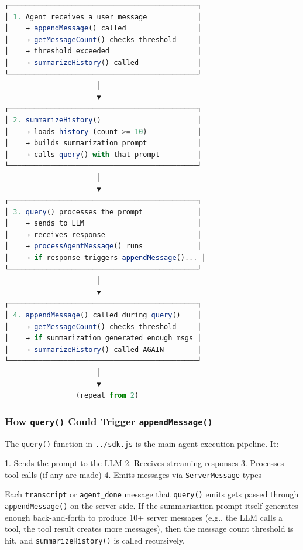 \begin{lstlisting}[language=TypeScript]
┌─────────────────────────────────────────────┐
│ 1. Agent receives a user message            │
│    → appendMessage() called                 │
│    → getMessageCount() checks threshold     │
│    → threshold exceeded                     │
│    → summarizeHistory() called              │
└─────────────────────────────────────────────┘
                      │
                      ▼
┌─────────────────────────────────────────────┐
│ 2. summarizeHistory()                       │
│    → loads history (count >= 10)            │
│    → builds summarization prompt            │
│    → calls query() with that prompt         │
└─────────────────────────────────────────────┘
                      │
                      ▼
┌─────────────────────────────────────────────┐
│ 3. query() processes the prompt             │
│    → sends to LLM                           │
│    → receives response                      │
│    → processAgentMessage() runs             │
│    → if response triggers appendMessage()... │
└─────────────────────────────────────────────┘
                      │
                      ▼
┌─────────────────────────────────────────────┐
│ 4. appendMessage() called during query()    │
│    → getMessageCount() checks threshold     │
│    → if summarization generated enough msgs │
│    → summarizeHistory() called AGAIN        │
└─────────────────────────────────────────────┘
                      │
                      ▼
                 (repeat from 2)


\end{lstlisting}



\subsubsection*{How \texttt{query()} Could Trigger \texttt{appendMessage()}}

The \texttt{query()} function in \texttt{../sdk.js} is the main agent execution pipeline. It:

1. Sends the prompt to the LLM
2. Receives streaming responses
3. Processes tool calls (if any are made)
4. Emits messages via \texttt{ServerMessage} types

Each \texttt{transcript} or \texttt{agent\_done} message that \texttt{query()} emits gets passed through \texttt{appendMessage()} on the server side. If the summarization prompt itself generates enough back-and-forth to produce 10+ server messages (e.g., the LLM calls a tool, the tool result creates more messages), then the message count threshold is hit, and \texttt{summarizeHistory()} is called recursively.

